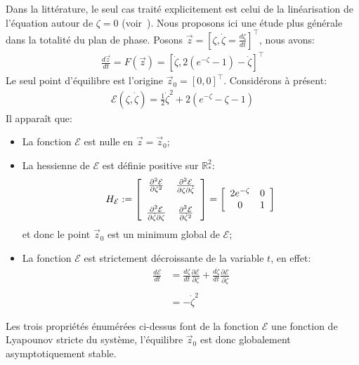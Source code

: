 Dans la littérature, le seul cas traité explicitement est celui de la linéarisation de l'équation autour de $\zeta=0$
(voir~\citet{chandra39}).
Nous proposons ici une étude plus générale dans la totalité du plan de phase. Posons $\vec{z}=\left[
\zeta,\dot{\zeta}=\frac{d\zeta}{dt}\right]^{\top}$, nous avons:
\begin{align}
\frac{d\vec{z}}{dt} =F\left(  \vec{z}\right)  =
\left[\dot{\zeta},2\left(  e^{-\zeta}-1\right)-\dot{\zeta}\right]^{\top} \label{sysdif}%
\end{align}
Le seul point d'équilibre est l'origine $\vec{z}_0=\left[  0,0\right]
^{\top}$. Considérons à présent:
\begin{align*}
\mathcal{E}(\zeta,\dot{\zeta}) = \frac{1}{2}\dot{\zeta}^2+2(e^{-\zeta}-\zeta-1)
\end{align*}
Il apparaît que:
\begin{itemize}
	\item La fonction $\mathcal{E}$ est nulle en $\vec{z}=\vec{z}_0$;
	\item La hessienne de $\mathcal{E}$ est définie positive sur $\mathbb{R}^2_*$: 
		\begin{align*}
			H_{\mathcal{E}}:=
			\left[
				\begin{array}[c]{cc}%
					\frac{\partial^2 \mathcal{E}}{\partial \zeta^2}         & \frac{\partial^2 \mathcal{E}}{\partial \zeta \partial \dot{\zeta}}\\
					 & \\
					\frac{\partial^2 \mathcal{E}}{\partial \dot{\zeta} \partial \zeta}& \frac{\partial^2 \mathcal{E}}{\partial \dot{\zeta}^2}
				\end{array}
				\right]
				=\left[\begin{array}[c]{cc}%
					2e^{-\zeta}         & 0\\
					0& 1
				\end{array}
				\right]
		\end{align*}
		et donc le point $\vec{z}_0$ est un minimum global de $\mathcal{E}$;
	\item La fonction $\mathcal{E}$ est strictement décroissante de la variable $t$, en effet:
		\begin{align*}
			\frac{d\mathcal{E}}{dt}&=\frac{d\zeta}{dt}\frac{\partial \mathcal{E}}{\partial \zeta}+\frac{d\dot{\zeta}}{dt}\frac{\partial \mathcal{E}}{\partial \dot{\zeta}} \\
			\\
			&=-\dot{\zeta}^2 
		\end{align*}

\end{itemize}
Les trois propriétés énumérées ci-dessus font de la fonction $\mathcal{E}$ une fonction de Lyapounov stricte du système, l'équilibre $\vec{z}_0$ est donc globalement asymptotiquement stable. 

